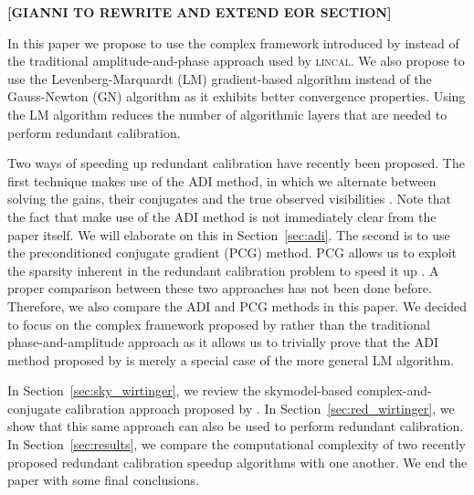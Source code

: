 \documentclass[useAMS,usenatbib]{mn2e}
\begin{document}
\noindent
\textbf{[GIANNI TO REWRITE AND EXTEND EOR SECTION]}

In this paper we propose to use the complex framework introduced by \citet{Smirnov2015} instead of the traditional amplitude-and-phase approach used by \textsc{lincal}.
We also propose to use the Levenberg-Marquardt (LM) gradient-based algorithm instead of the Gauss-Newton (GN) algorithm as it exhibits better convergence properties.
Using the LM algorithm reduces the number of algorithmic layers that are needed to perform redundant calibration. 

Two ways of speeding up redundant calibration have recently been proposed. The first technique makes use of the ADI method, in which we alternate between solving the gains, their conjugates and 
the true observed visibilities \citep{Wijnholds2012,Marthi2014}. Note that the fact that \citet{Marthi2014} make use of the ADI method is not immediately clear
from the paper itself. We will elaborate on this in Section~\ref{sec:adi}. The second is to use the preconditioned conjugate gradient (PCG) method. PCG allows us to exploit the sparsity inherent in the redundant calibration problem 
to speed it up \citep{Liu2010}. A proper comparison between these two approaches has not been done before.
Therefore, we also compare the ADI \citep{Marthi2014} and PCG \citep{Liu2010} methods in this paper. We decided to focus on the complex framework proposed by \citet{Smirnov2015} rather than the traditional phase-and-amplitude approach as it 
allows us to trivially prove that the ADI method proposed by \citep{Marthi2014} is merely a special case of the more general LM algorithm. 


In Section~\ref{sec:sky_wirtinger}, we review the skymodel-based complex-and-conjugate calibration approach proposed by \citet{Smirnov2015}.
In Section~\ref{sec:red_wirtinger}, we show that this same approach can also be used to perform redundant calibration.
In Section~\ref{sec:results}, we compare the computational complexity of two recently proposed redundant calibration speedup algorithms with one another.
We end the paper with some final conclusions.
\end{document}

